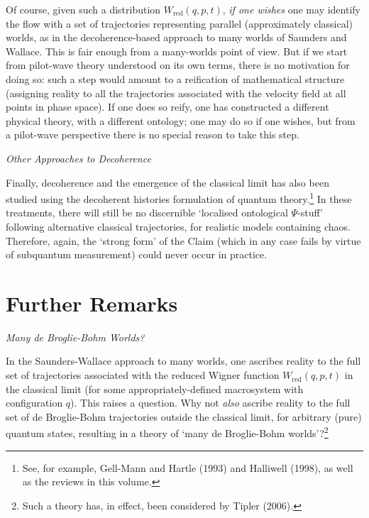 \documentclass[12pt]{article}%
\begin{document}
Of course, given such a distribution $W_{\mathrm{red}}(q,p,t)$, \textit{if one
wishes} one may identify the flow with a set of trajectories representing
parallel (approximately classical) worlds, as in the decoherence-based
approach to many worlds of Saunders and Wallace. This is fair enough from a
many-worlds point of view. But if we start from pilot-wave theory understood
on its own terms, there is no motivation for doing so: such a step would
amount to a reification of mathematical structure (assigning reality to all
the trajectories associated with the velocity field at all points in phase
space). If one does so reify, one has constructed a different physical theory,
with a different ontology; one may do so if one wishes, but from a pilot-wave
perspective there is no special reason to take this step.

\begin{center}
\textit{Other Approaches to Decoherence}
\end{center}

Finally, decoherence and the emergence of the classical limit has also been
studied using the decoherent histories formulation of quantum
theory.\footnote{See, for example, Gell-Mann and Hartle (1993) and Halliwell
(1998), as well as the reviews in this volume.} In these treatments, there
will still be no discernible `localised ontological $\Psi$-stuff' following
alternative classical trajectories, for realistic models containing chaos.
Therefore, again, the `strong form' of the Claim (which in any case fails by
virtue of subquantum measurement) could never occur in practice.

\section{Further Remarks}

\begin{center}
\textit{Many de Broglie-Bohm Worlds?}
\end{center}

In the Saunders-Wallace approach to many worlds, one ascribes reality to the
full set of trajectories associated with the reduced Wigner function
$W_{\mathrm{red}}(q,p,t)$ in the classical limit (for some
appropriately-defined macrosystem with configuration $q$). This raises a
question. Why not \textit{also} ascribe reality to the full set of de
Broglie-Bohm trajectories outside the classical limit, for arbitrary (pure)
quantum states, resulting in a theory of `many de Broglie-Bohm
worlds'?\footnote{Such a theory has, in effect, been considered by Tipler
(2006).}
\end{document}
